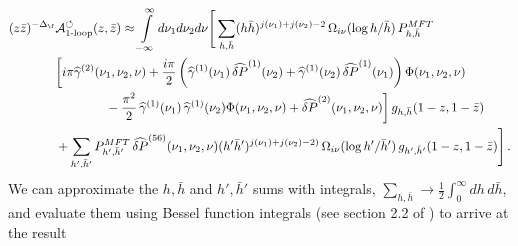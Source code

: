 \begin{align}
	(z\bar{z})^{-\Delta_{\f}} & \mathcal{A}_{\text{1-loop}}^{\circlearrowleft}(z,\bar{z}) \approx \int\limits_{-\infty}^{\infty} d\nu_{1}d\nu_2d\nu \Bigg[\sum_{h,\bar{h}}  (h\bar{h})^{j(\nu_1) +j(\nu_2) -2}\,\Omega_{i\nu}(\log h/\bar{h})\, P^{MFT}_{h,\bar{h}}
	\label{eq:very_long}                                                                                                                                                                                                                                                          \\
	                          & \bigg[i\pi \widehat{\gamma}^{(2)}(\nu_1,\nu_2,\nu)  + \frac{i\pi}{2}\left(\widehat{\gamma}^{(1)}(\nu_1)\,\widehat{\delta P}^{(1)}(\nu_2) + \widehat{\gamma}^{(1)}(\nu_2)\,\widehat{\delta P}^{(1)}(\nu_1)\right)\Phi(\nu_1,\nu_2,\nu)   \nonumber \\
	                          & \qquad  \qquad -\frac{\pi^2}{2}\,\widehat{\gamma}^{(1)}(\nu_1)\,\widehat{\gamma}^{(1)}(\nu_2)\Phi(\nu_1,\nu_2,\nu) + \widehat{\delta P}^{(2)}(\nu_1,\nu_2,\nu)   \bigg]\, g_{h,\bar{h}}(1-z,1-\bar{z}) \nonumber                                  \\
	                          & + \sum_{h',\bar{h}'} P^{MFT}_{h',\bar{h}'} \,\widehat{\delta P}^{(56)}(\nu_1,\nu_2,\nu) (h'\bar{h}')^{j(\nu_1) +j(\nu_2) -2)}\,\Omega_{i\nu}(\log h'/\bar{h}') \,g_{h',\bar{h}'}(1-z,1-\bar{z}) \Bigg]\,.
	\nonumber
\end{align}
We can approximate the $h,\bar{h}$ and $h',\bar{h}'$ sums with integrals, $\sum_{h,\bar{h}} \rightarrow \frac{1}{2}\int_{0}^{\infty}dh\, d\bar{h}$, and evaluate them using Bessel function integrals (see section 2.2 of \cite{Meltzer:2019pyl}) to arrive at the result
